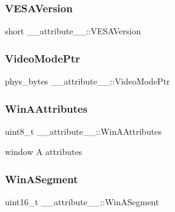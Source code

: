 \subsubsection{\texorpdfstring{V\+E\+S\+A\+Version}{VESAVersion}}
{\footnotesize\ttfamily short \+\_\+\+\_\+attribute\+\_\+\+\_\+\+::\+V\+E\+S\+A\+Version}

\hypertarget{struct____attribute_____ac3b2d0805352b33b6bb2610883e89e22}{}\label{struct____attribute_____ac3b2d0805352b33b6bb2610883e89e22} 
\subsubsection{\texorpdfstring{Video\+Mode\+Ptr}{VideoModePtr}}
{\footnotesize\ttfamily phys\+\_\+bytes \+\_\+\+\_\+attribute\+\_\+\+\_\+\+::\+Video\+Mode\+Ptr}

\hypertarget{struct____attribute_____aeffe4dec59c5a757f65a97a66c812d3b}{}\label{struct____attribute_____aeffe4dec59c5a757f65a97a66c812d3b} 
\subsubsection{\texorpdfstring{Win\+A\+Attributes}{WinAAttributes}}
{\footnotesize\ttfamily uint8\+\_\+t \+\_\+\+\_\+attribute\+\_\+\+\_\+\+::\+Win\+A\+Attributes}



window A attributes 

\hypertarget{struct____attribute_____a7cde26f911e3df97b7498ee139d8de12}{}\label{struct____attribute_____a7cde26f911e3df97b7498ee139d8de12} 
\subsubsection{\texorpdfstring{Win\+A\+Segment}{WinASegment}}
{\footnotesize\ttfamily uint16\+\_\+t \+\_\+\+\_\+attribute\+\_\+\+\_\+\+::\+Win\+A\+Segment}



